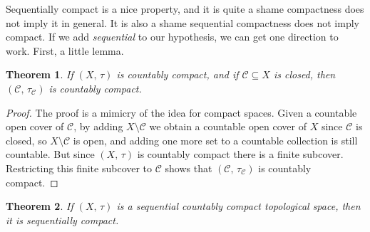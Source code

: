\documentclass{article}
\theoremstyle{plain}
\newtheorem{theorem}{Theorem}[section]
\theoremstyle{normal}
\begin{document}
        Sequentially compact is a nice property, and it is quite a shame
        compactness does not imply it in general. It is also a shame
        sequential compactness does not imply compact. If we add
        \textit{sequential} to our hypothesis, we can get one direction to
        work. First, a little lemma.
        \begin{theorem}
            If $(X,\,\tau)$ is countably compact, and if
            $\mathcal{C}\subseteq{X}$ is closed, then
            $(\mathcal{C},\,\tau_{\mathcal{C}})$ is countably compact.
        \end{theorem}
        \begin{proof}
            The proof is a mimicry of the idea for compact spaces. Given
            a countable open cover of $\mathcal{C}$, by adding
            $X\setminus\mathcal{C}$ we obtain a countable open cover of $X$
            since $\mathcal{C}$ is closed, so $X\setminus\mathcal{C}$ is open,
            and adding one more set to a countable collection is still
            countable. But since $(X,\,\tau)$ is countably compact there is a
            finite subcover. Restricting this finite subcover to $\mathcal{C}$
            shows that $(\mathcal{C},\,\tau_{\mathcal{C}})$ is countably
            compact. 
        \end{proof}
        \begin{theorem}
            If $(X,\,\tau)$ is a sequential countably compact topological space,
            then it is sequentially compact.
        \end{theorem}
\end{document}
